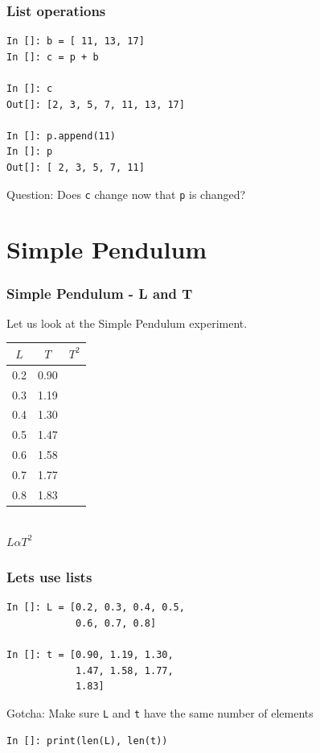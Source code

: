 \documentclass[14pt,compress]{beamer}
\newcounter{time}
\newcommand{\inctime}[1]{\addtocounter{time}{#1}{\tiny \thetime\ m}}
\newcommand{\typ}[1]{\lstinline{#1}}
\begin{document}
\begin{frame}[fragile]
\frametitle{List operations}
\begin{lstlisting}
In []: b = [ 11, 13, 17]
In []: c = p + b

In []: c
Out[]: [2, 3, 5, 7, 11, 13, 17]

In []: p.append(11)
In []: p
Out[]: [ 2, 3, 5, 7, 11]
\end{lstlisting}
Question: Does \typ{c} change now that \typ{p} is changed?
\inctime{10}
\end{frame}

\section{Simple Pendulum}
\begin{frame}[fragile]
\frametitle{Simple Pendulum - L and T}
Let us look at the Simple Pendulum experiment.
\begin{center}
\begin{small}
\begin{tabular}{| c | c | c |}
\hline
$L$ & $T$ & $T^2$ \\ \hline
0.2 & 0.90 & \\ \hline
0.3 & 1.19 & \\ \hline
0.4 & 1.30 & \\ \hline
0.5 & 1.47 & \\ \hline
0.6 & 1.58 & \\ \hline
0.7 & 1.77 & \\ \hline
0.8 & 1.83 & \\ \hline
\end{tabular}
\end{small}\\
\alert{$L \alpha T^2$}
\end{center}
\end{frame}

\begin{frame}[fragile]
\frametitle{Lets use lists}
\begin{lstlisting}
In []: L = [0.2, 0.3, 0.4, 0.5,
            0.6, 0.7, 0.8]

In []: t = [0.90, 1.19, 1.30,
            1.47, 1.58, 1.77,
            1.83]
\end{lstlisting}
\alert{Gotcha}: Make sure \typ{L} and \typ{t} have the same number
of elements

\begin{lstlisting}
In []: print(len(L), len(t))
\end{lstlisting}

\end{frame}
\end{document}
